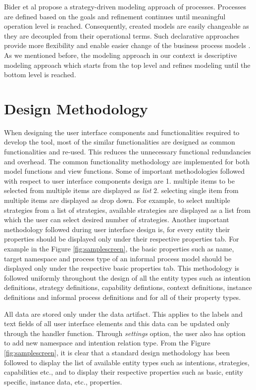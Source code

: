 Bider et al \cite{bider2005strategy} propose a strategy-driven modeling approach of processes. Processes are defined based on the goals and refinement continues until meaningful operation level is reached. Consequently, created models are easily changeable as they are decoupled from their operational terms. Such declarative approaches provide more flexibility and enable easier change of the business process models \cite{Sungur2016}. As we mentioned before, the modeling approach in our context is descriptive modeling approach which starts from the top level and refines modeling until the bottom level is reached. 

\section{Design Methodology}
\label{sec:designmethodology}
When designing the user interface components and functionalities required to develop the tool, most of the similar functionalities are 
designed as common functionalities and re-used. This reduces the unnecessary functional redundancies and overhead. The common functionality methodology are implemented for both model functions and view functions.  Some of important methodologies followed with respect to user interface components design are 1. multiple items to be selected from multiple items are displayed as  \textit{list} 2. selecting single item from multiple items are displayed as drop down. For example, to select multiple strategies from a list of strategies, available strategies are displayed as a list from which the user can select desired number of strategies. Another important methodology followed during user interface design is, for every entity their properties should be displayed only under their respective properties tab. For example in the Figure \ref{fig:samplescreen}, the basic properties such as name, target namespace and process type of an informal process model should be displayed only under the respective basic properties tab. This methodology is followed uniformly throughout the design of all the entity types such as intention definitions, strategy definitions, capability defintions, context definitions, instance definitions and informal process definitions and for all of their property types. 

All data are stored only under the data artifact. This applies to the labels and text fields of all user interface elements and this data can be updated only through the handler function. Through \textit{settings} option, the user also has option to add new namespace and intention relation type. From the Figure \ref{fig:samplescreen}, it is clear that a standard design methodology has been followed to display the list of available entity types such as intentions, strategies, capabilities etc., and to display their respective properties such as basic, entity specific, instance data, etc., properties. 

